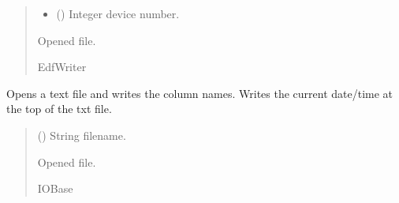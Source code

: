 \documentclass[letterpaper,10pt,english]{sphinxmanual}
\begin{document}
\begin{fulllineitems}
\begin{fulllineitems}
\begin{quote}
\begin{description}
\begin{itemize}
\item {} 
\sphinxAtStartPar
{} () \textendash{} Integer device number.

\end{itemize}

\sphinxAtStartPar
Opened file.

\sphinxAtStartPar
EdfWriter

\end{description}\end{quote}

\end{fulllineitems}


\begin{fulllineitems}
\label{\detokenize{Setup_PodInterface:Setup_PodInterface.Setup_Interface._OpenSaveFile_TXT}}
\pysigstartsignatures
{}
\pysigstopsignatures
\sphinxAtStartPar
Opens a text file and writes the column names. Writes the current date/time at the top of         the txt file.
\begin{quote}\begin{description}
\sphinxAtStartPar
{} () \textendash{} String filename.

\sphinxAtStartPar
Opened file.

\sphinxAtStartPar
IOBase

\end{description}\end{quote}

\end{fulllineitems}



\end{fulllineitems}
\end{document}
